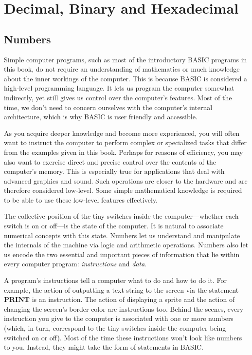 \chapter{Decimal, Binary and Hexadecimal}

\section{Numbers}
Simple computer programs, such as most of the introductory BASIC programs in this book, do not require an understanding of mathematics or much knowledge about the inner workings of the computer. This is because BASIC is considered a high-level programming language. It lets us program the computer somewhat indirectly, yet still gives us control over the computer’s features. Most of the time, we don’t need to concern ourselves with the computer’s internal architecture, which is why BASIC is user friendly and accessible.

As you acquire deeper knowledge and become more experienced, you will often want to instruct the computer to perform complex or specialized tasks that differ from the examples given in this book. Perhaps for reasons of efficiency, you may also want to exercise direct and precise control over the contents of the computer’s memory. This is especially true for applications that deal with advanced graphics and sound. Such operations are closer to the hardware and are therefore considered low-level. Some simple mathematical knowledge is required to be able to use these low-level features effectively.

The collective position of the tiny switches inside the computer---whether each switch is on or off---is the state of the computer. It is natural to associate numerical concepts with this state. Numbers let us understand and manipulate the internals of the machine via logic and arithmetic operations. Numbers also let us encode the two essential and important pieces of information that lie within every computer program: {\it instructions} and {\it data}.

A program’s instructions tell a computer what to do and how to do it. For example, the action of outputting a text string to the screen via the statement {\bf PRINT} is an instruction. The action of displaying a sprite and the action of changing the screen’s border color are instructions too. Behind the scenes, every instruction you give to the computer is associated with one or more numbers (which, in turn, correspond to the tiny switches inside the computer being switched on or off). Most of the time these instructions won’t look like numbers to you. Instead, they might take the form of statements in BASIC.

